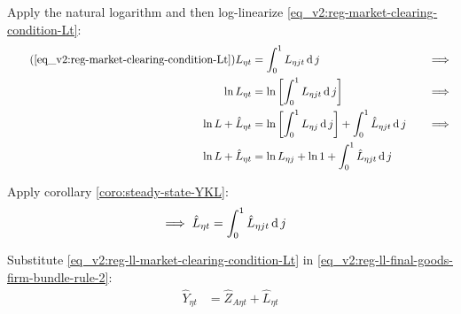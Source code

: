 \documentclass[../thesis.tex]{subfiles}
\begin{document}
Apply the natural logarithm and then log-linearize \ref{eq_v2:reg-market-clearing-condition-Lt}:
\begin{alignat}{2}
	\tag{\ref{eq_v2:reg-market-clearing-condition-Lt}}
	L_{\eta t} &= \int_{0}^{1} L_{\eta jt} \dif j &\implies \\
	\ln L_{\eta t} &= \ln \left[ \int_{0}^{1} L_{\eta jt} \dif j \right] &\implies \nonumber \\
	\ln L + \hat{L}_{\eta t} &= \ln \left[ \int_{0}^{1} L_{\eta j} \dif j \right] + \int_{0}^{1} \hat{L}_{\eta jt} \dif j \quad &\implies \nonumber \\
	\ln L + \hat{L}_{\eta t} &= \ln L_{\eta j} + \ln 1 + \int_{0}^{1} \hat{L}_{\eta jt} \dif j \nonumber
\end{alignat}

Apply corollary \ref{coro:steady-state-YKL}:
\begin{align}
	\implies \hat{L}_{\eta t} &= \int_{0}^{1} \hat{L}_{\eta jt} \operatorname{d} j \label{eq_v2:reg-ll-market-clearing-condition-Lt}
\end{align}

\begin{comment}
	By analogy, the total capital deviation is the sum of all firm's deviations:
	\begin{align}
		\hat{K}_{\eta t} = \int_{0}^{1} \hat{K}_{\eta jt} \dif j \label{eq_v2:reg-ll-capital-clearing-condition}
	\end{align}
\end{comment}


Substitute \ref{eq_v2:reg-ll-market-clearing-condition-Lt} in \ref{eq_v2:reg-ll-final-goods-firm-bundle-rule-2}: %
\begin{align}
	\hat{Y}_{\eta t} &= \hat{Z}_{A\eta t} + \hat{L}_{\eta t} \label{eq_v2:reg-ll-final-goods-firm-bundle-rule-3}
\end{align}

\end{document}
